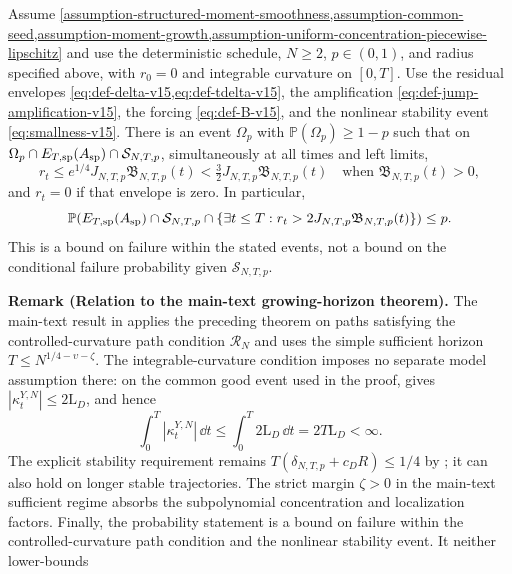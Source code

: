 \begin{theorem}
\label{thm:fixed-schedule-high-prob-r-v15}
Assume \cref{assumption-structured-moment-smoothness,assumption-common-seed,assumption-moment-growth,assumption-uniform-concentration-piecewise-lipschitz}
and use the deterministic schedule, $N\ge2$, $p\in(0,1)$, and radius
specified above, with $r_0=0$ and integrable curvature on $[0,T]$.
Use the residual envelopes \cref{eq:def-delta-v15,eq:def-tdelta-v15},
the amplification \eqref{eq:def-jump-amplification-v15}, the forcing
\eqref{eq:def-B-v15}, and the nonlinear stability event \eqref{eq:smallness-v15}.
There is an event $\Omega_p$ with $\mathbb P(\Omega_p)\ge1-p$ such that on
$\Omega_p\cap E_{T,\rm sp}(A_{\rm sp})\cap\mathcal S_{N,T,p}$,
simultaneously at all times and left limits,
\begin{equation}
\label{eq:high-prob-r-bound-v15}
r_t\le e^{1/4}J_{N,T,p}\mathfrak B_{N,T,p}(t)
<\tfrac32J_{N,T,p}\mathfrak B_{N,T,p}(t)
\quad\text{when }\mathfrak B_{N,T,p}(t)>0,
\end{equation}
and $r_t=0$ if that envelope is zero. In particular,
\[
\mathbb P\!\left(E_{T,\rm sp}(A_{\rm sp})\cap\mathcal S_{N,T,p}
\cap\{\exists t\le T:r_t>2J_{N,T,p}\mathfrak B_{N,T,p}(t)\}\right)\le p.
\]
This is a bound on failure within the stated events, not a bound on the
conditional failure probability given $\mathcal S_{N,T,p}$.
\end{theorem}
\par\noindent\textbf{Remark (Relation to the main-text growing-horizon theorem).}
The main-text result in  applies the preceding theorem
on paths satisfying the controlled-curvature path condition $\mathcal R_N$ and uses the simple sufficient horizon
$T\le N^{1/4-\upsilon-\zeta}$. The integrable-curvature condition imposes no separate
model assumption there: on the common good event used in the proof,
 gives
$|\kappa_t^{Y,N}|\le2\mathrm L_D$, and hence
\[
 \int_0^T|\kappa_t^{Y,N}|\,\dd t
 \le \int_0^T2\mathrm L_D\,\dd t
 =2T\mathrm L_D<\infty.
\]
The explicit stability requirement remains
$T(\delta_{N,T,p}+c_DR)\le1/4$ by
; it can also hold on longer stable trajectories. The
strict margin $\zeta>0$ in the main-text sufficient regime absorbs the
subpolynomial concentration and localization factors. Finally, the probability
statement is a bound on failure within the controlled-curvature path condition
and the nonlinear stability event. It neither lower-bounds
